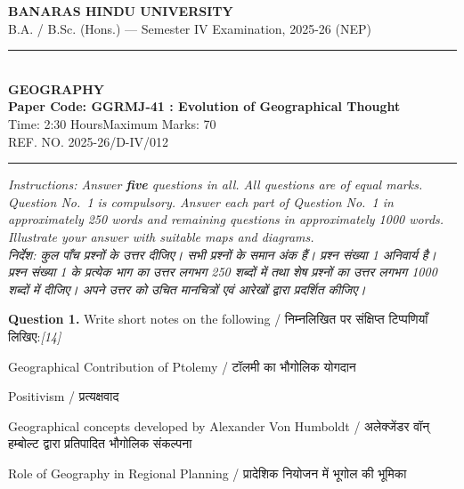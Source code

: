 \documentclass[11pt,a4paper]{article}
\newcommand{\pts}[1]{\hfill   \textit{[#1]}}
\begin{document}
\begin{center}
  {\large\bfseries BANARAS HINDU UNIVERSITY}\\[2pt]
  {\normalsize B.A. / B.Sc. (Hons.) --- Semester IV Examination, 2025-26 (NEP)}\\[6pt]
  \rule{0.8\linewidth}{0.5pt}\\[6pt]
  {\large\bfseries GEOGRAPHY}\\[4pt]
  {\large\bfseries Paper Code: GGRMJ-41 : Evolution of Geographical Thought}\\[4pt]
  {\normalsize Time: 2:30 Hours\hfill Maximum Marks: 70}\\[2pt]
  {\small REF. NO. 2025-26/D-IV/012}
\end{center}

\rule{\linewidth}{0.4pt}

\smallskip



\noindent   \textit{Instructions: Answer   \textbf{five} questions in all. All questions are of equal marks. Question No.~1 is compulsory. Answer each part of Question No.~1 in approximately 250 words and remaining questions in approximately 1000 words. Illustrate your answer with suitable maps and diagrams.}\\[4pt]



\noindent   \textit{निर्देश: कुल पाँच प्रश्नों के उत्तर दीजिए। सभी प्रश्नों के समान अंक हैं। प्रश्न संख्या 1 अनिवार्य है। प्रश्न संख्या 1 के प्रत्येक भाग का उत्तर लगभग 250 शब्दों में तथा शेष प्रश्नों का उत्तर लगभग 1000 शब्दों में दीजिए। अपने उत्तर को उचित मानचित्रों एवं आरेखों द्वारा प्रदर्शित कीजिए।}

\bigskip




\noindent   \textbf{Question 1.} Write short notes on the following / निम्नलिखित पर संक्षिप्त टिप्पणियाँ लिखिए:\pts{14}

\begin{parts}
  \item Geographical Contribution of Ptolemy / टॉलमी का भौगोलिक योगदान
  \item Positivism / प्रत्यक्षवाद
  \item Geographical concepts developed by Alexander Von Humboldt / अलेक्जेंडर वॉन् हम्बोल्ट द्वारा प्रतिपादित भौगोलिक संकल्पना
  \item Role of Geography in Regional Planning / प्रादेशिक नियोजन में भूगोल की भूमिका
\end{parts}
\end{document}
